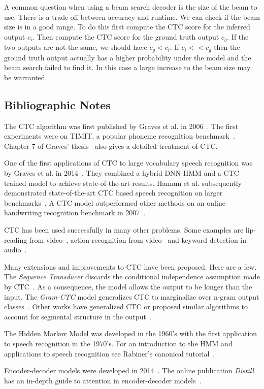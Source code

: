A common question when using a beam search decoder is the size of the beam to
use. There is a trade-off between accuracy and runtime. We can check if the
beam size is in a good range. To do this first compute the CTC score for the
inferred output $c_i$. Then compute the CTC score for the ground truth output
$c_g$. If the two outputs are not the same, we should have $c_g < c_i$. If $c_i
<< c_g$ then the ground truth output actually has a higher probability under
the model and the beam search failed to find it. In this case a large increase
to the beam size may be warranted.

\subsection{Bibliographic Notes}

The CTC algorithm was first published by Graves et al. in
2006~\cite{graves2006}. The first experiments were on TIMIT, a popular phoneme
recognition benchmark~\cite{lopes2011}. Chapter 7 of Graves'
thesis~\cite{graves2012} also gives a detailed treatment of CTC.

One of the first applications of CTC to large vocabulary speech recognition was
by Graves et al. in 2014~\cite{graves2014}. They combined a hybrid DNN-HMM and
a CTC trained model to achieve state-of-the-art results. Hannun et al.
subsequently demonstrated state-of-the-art CTC based speech recognition on
larger benchmarks~\cite{hannun2014deepspeech}. A CTC model outperformed other
methods on an online handwriting recognition benchmark in
2007~\cite{liwicki2007}.

CTC has been used successfully in many other problems. Some examples are
lip-reading from video~\cite{assael2016}, action recognition from
video~\cite{huang2016} and keyword detection in audio~\cite{fernandez2007,
lengerich2016}.

Many extensions and improvements to CTC have been proposed. Here are a few.
The {\it Sequence Transducer} discards the conditional independence assumption
made by CTC~\cite{graves2012transducer}. As a consequence, the model allows the
output to be longer than the input. The {\it Gram-CTC} model generalizes CTC to
marginalize over n-gram output classes~\cite{liu2017}. Other works have
generalized CTC or proposed similar algorithms to account for segmental
structure in the output~\cite{wang2017, kong2016}.

The Hidden Markov Model was developed in the 1960's with the first application
to speech recognition in the 1970's. For an introduction to the HMM and
applications to speech recognition see Rabiner's canonical
tutorial~\cite{rabiner1989}.

Encoder-decoder models were developed in 2014~\cite{cho2014, sutskever2014}.
The online publication {\it Distill} has an in-depth guide to attention in
encoder-decoder models~\cite{olah2016}.
